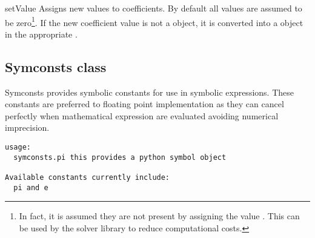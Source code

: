 \begin{methoddesc}[NonLinearPDE]{setValue}{
}
Assigns new values to coefficients. By default all values are assumed to be
zero\footnote{In fact, it is assumed they are not present by assigning the
value . This can be used by the solver library to reduce
computational costs.}.
If the new coefficient value is not a \Data object, it is converted into a
\Data object in the appropriate \FunctionSpace.
\end{methoddesc}

\subsection{Symconsts class}
Symconsts provides symbolic constants for use in symbolic expressions. These constants are preferred to floating point implementation as they can cancel perfectly when mathematical expression are evaluated avoiding numerical imprecision. 
\begin{verbatim}
usage:
  symconsts.pi this provides a python symbol object
  
Available constants currently include:
  pi and e 
\end{verbatim}


